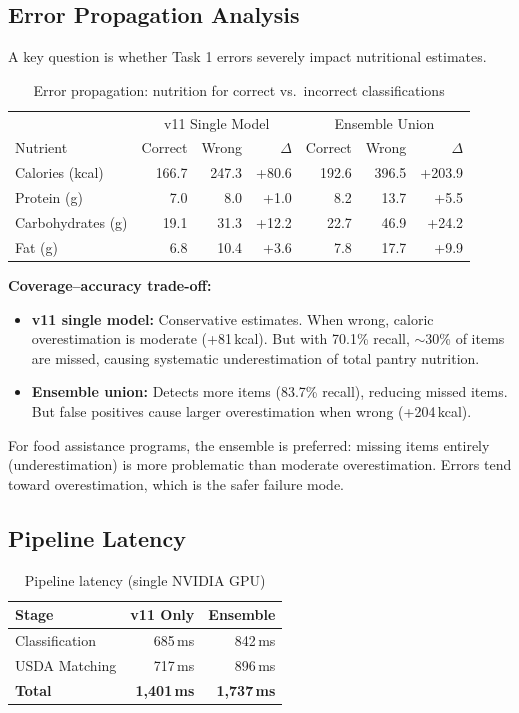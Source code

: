 \documentclass[11pt]{article}
\begin{document}
\subsection{Error Propagation Analysis}

A key question is whether Task 1 errors severely impact nutritional estimates.

\begin{table}[h]
\centering
\caption{Error propagation: nutrition for correct vs.\ incorrect classifications}
\label{tab:error_prop}
\begin{tabular}{lrrr|rrr}
\toprule
 & \multicolumn{3}{c|}{v11 Single Model} & \multicolumn{3}{c}{Ensemble Union} \\
Nutrient & Correct & Wrong & $\Delta$ & Correct & Wrong & $\Delta$ \\
\midrule
Calories (kcal) & 166.7 & 247.3 & +80.6 & 192.6 & 396.5 & +203.9 \\
Protein (g) & 7.0 & 8.0 & +1.0 & 8.2 & 13.7 & +5.5 \\
Carbohydrates (g) & 19.1 & 31.3 & +12.2 & 22.7 & 46.9 & +24.2 \\
Fat (g) & 6.8 & 10.4 & +3.6 & 7.8 & 17.7 & +9.9 \\
\bottomrule
\end{tabular}
\end{table}

\textbf{Coverage--accuracy trade-off:}
\begin{itemize}[nosep,leftmargin=1.5em]
  \item \textbf{v11 single model:} Conservative estimates. When wrong, caloric overestimation is moderate (+81\,kcal). But with 70.1\% recall, $\sim$30\% of items are missed, causing systematic underestimation of total pantry nutrition.
  \item \textbf{Ensemble union:} Detects more items (83.7\% recall), reducing missed items. But false positives cause larger overestimation when wrong (+204\,kcal).
\end{itemize}

For food assistance programs, the ensemble is preferred: missing items entirely (underestimation) is more problematic than moderate overestimation. Errors tend toward overestimation, which is the safer failure mode.

\subsection{Pipeline Latency}

\begin{table}[h]
\centering
\caption{Pipeline latency (single NVIDIA GPU)}
\label{tab:latency}
\begin{tabular}{lrr}
\toprule
Stage & v11 Only & Ensemble \\
\midrule
Classification & 685\,ms & 842\,ms \\
USDA Matching & 717\,ms & 896\,ms \\
\midrule
\textbf{Total} & \textbf{1,401\,ms} & \textbf{1,737\,ms} \\
\bottomrule
\end{tabular}
\end{table}
\end{document}
